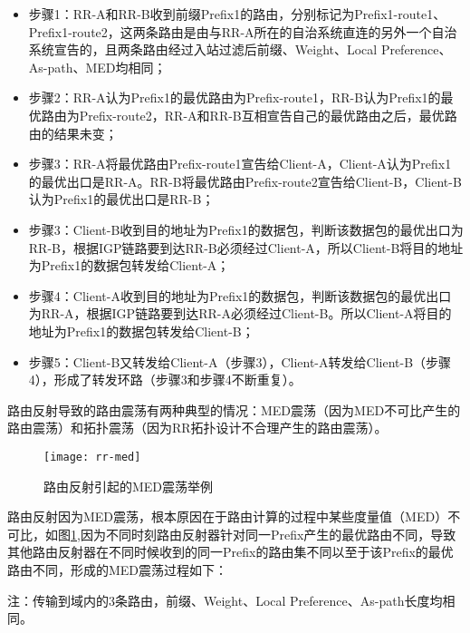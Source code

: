 \begin{itemize}
\item 步骤1：RR-A和RR-B收到前缀Prefix1的路由，分别标记为Prefix1-route1、Prefix1-route2，这两条路由是由与RR-A所在的自治系统直连的另外一个自治系统宣告的，且两条路由经过入站过滤后前缀、Weight、Local Preference、As-path、MED均相同；
\item 步骤2：RR-A认为Prefix1的最优路由为Prefix-route1，RR-B认为Prefix1的最优路由为Prefix-route2，RR-A和RR-B互相宣告自己的最优路由之后，最优路由的结果未变；
\item 步骤3：RR-A将最优路由Prefix-route1宣告给Client-A，Client-A认为Prefix1的最优出口是RR-A。RR-B将最优路由Prefix-route2宣告给Client-B，Client-B认为Prefix1的最优出口是RR-B；
\item 步骤3：Client-B收到目的地址为Prefix1的数据包，判断该数据包的最优出口为RR-B，根据IGP链路要到达RR-B必须经过Client-A，所以Client-B将目的地址为Prefix1的数据包转发给Client-A；
\item 步骤4：Client-A收到目的地址为Prefix1的数据包，判断该数据包的最优出口为RR-A，根据IGP链路要到达RR-A必须经过Client-B。所以Client-A将目的地址为Prefix1的数据包转发给Client-B；
\item 步骤5：Client-B又转发给Client-A（步骤3），Client-A转发给Client-B（步骤4），形成了转发环路（步骤3和步骤4不断重复）。\\
\end{itemize}



路由反射导致的路由震荡有两种典型的情况：MED震荡（因为MED不可比产生的路由震荡）和拓扑震荡（因为RR拓扑设计不合理产生的路由震荡）。


\begin{figure}
  \centering
  \texttt{[image: rr-med]}
  \caption{路由反射引起的MED震荡举例\cite{Flavel2009Stable}}
  \label{fig:rr-med}
\end{figure}


路由反射因为MED震荡，根本原因在于路由计算的过程中某些度量值（MED）不可比，如图\ref{fig:rr-med},因为不同时刻路由反射器针对同一Prefix产生的最优路由不同，导致其他路由反射器在不同时候收到的同一Prefix的路由集不同以至于该Prefix的最优路由不同，形成的MED震荡过程如下：

注：传输到域内的3条路由，前缀、Weight、Local Preference、As-path长度均相同。

